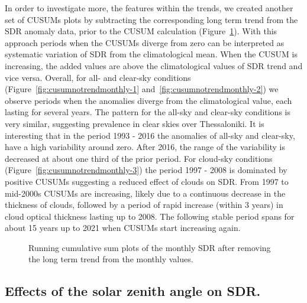 \documentclass[An awesome
journal,,,moreauthors,pdftex]{Definitions/mdpi}
\begin{document}
In order to investigate more, the features within the trends, we created
another set of CUSUMs plots by subtracting the corresponding long term
trend from the SDR anomaly data, prior to the CUSUM calculation
(Figure~\ref{fig:cusumnotrendmonthly}). With this approach periods when
the CUSUMs diverge from zero can be interpreted as systematic variation
of SDR from the climatological mean. When the CUSUM is increasing, the
added values are above the climatological values of SDR trend and vice
versa. Overall, for all- and clear-sky conditions
(Figure~\ref{fig:cusumnotrendmonthly-1}
and~\ref{fig:cusumnotrendmonthly-2}) we observe periods when the
anomalies diverge from the climatological value, each lasting for
several years. The pattern for the all-sky and clear-sky conditions is
very similar, suggesting prevalence in clear skies over Thessaloniki. It
is interesting that in the period 1993 - 2016 the anomalies of all-sky
and clear-sky, have a high variability around zero. After 2016, the
range of the variability is decreased at about one third of the prior
period. For cloud-sky conditions
(Figure~\ref{fig:cusumnotrendmonthly-3}) the period 1997 - 2008 is
dominated by positive CUSUMs suggesting a reduced effect of clouds on
SDR. From 1997 to mid-2000s CUSUMs are increasing, likely due to a
continuous decrease in the thickness of clouds, followed by a period of
rapid increase (within 3 years) in cloud optical thickness lasting up to
2008. The following stable period spans for about 15 years up to 2021
when CUSUMs start increasing again.

\begin{figure}[h!]

{\centering {}

}

\caption{Running cumulative sum plots of the monthly SDR after removing the long term trend from the monthly values.}\label{fig:cusumnotrendmonthly}
\end{figure}

\hypertarget{effects-of-the-solar-zenith-angle-on-sdr.}{%
\subsection{Effects of the solar zenith angle on
SDR.}\label{effects-of-the-solar-zenith-angle-on-sdr.}}
\end{document}
